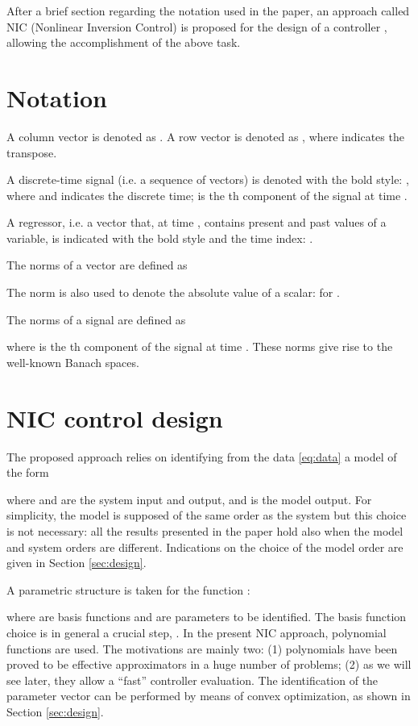 \documentclass[twocolumn,english,journal]{IEEEtran}
\begin{document}
After a brief section regarding the notation used in the paper, an
approach called NIC (Nonlinear Inversion Control) is proposed for
the design of a controller , allowing the accomplishment
of the above task.


\section{Notation}

A column vector  is denoted as .
A row vector  is denoted as ,
where  indicates the transpose.

A discrete-time signal (i.e. a sequence of vectors) is denoted with
the bold style: , where 
and  indicates the discrete time;  is the
th component of the signal  at time .

A regressor, i.e. a vector that, at time , contains  present
and past values of a variable, is indicated with the bold style and
the time index: .

The  norms of a vector 
are defined as

The  norm is also used to denote the absolute value
of a scalar: 
for . 

The  norms of a signal 
are defined as

where  is the th component of the signal 
at time . These norms give rise to the well-known 
Banach spaces.


\section{NIC control design}

\label{sub:nl_des}

The proposed approach relies on identifying from the data \eqref{eq:data}
a model of the form

where  and  are the system input and output, and 
is the model output. For simplicity, the model is supposed of the
same order as the system but this choice is not necessary: all the
results presented in the paper hold also when the model and system
orders are different. Indications on the choice of the model order
are given in Section \ref{sec:design}.

A parametric structure is taken for the function :

where  are basis functions and  are parameters
to be identified. The basis function choice is in general a crucial
step, \cite{LLju1,HsNoAUT06,Novara2011711}. In the present NIC approach,
polynomial functions are used. The motivations are mainly two: (1)
polynomials have been proved to be effective approximators in a huge
number of problems; (2) as we will see later, they allow a ``fast''
controller evaluation. The identification of the parameter vector
 can be performed by
means of convex optimization, as shown in Section \ref{sec:design}.
\end{document}
